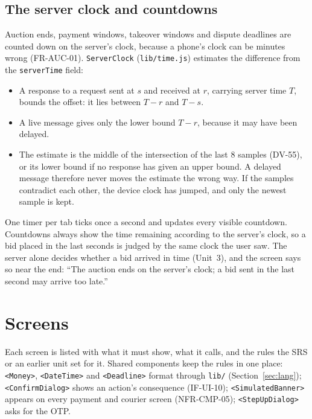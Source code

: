 \documentclass[11pt,a4paper]{article}
\begin{document}
\subsection{The server clock and countdowns}
\label{sec:clock}
Auction ends, payment windows, takeover windows and dispute deadlines are counted down on the server's clock, because a phone's clock can be minutes wrong (FR-AUC-01). \texttt{ServerClock} (\texttt{lib/time.js}) estimates the difference from the \texttt{serverTime} field:
\begin{itemize}[nosep]
  \item A response to a request sent at $s$ and received at $r$, carrying server time $T$, bounds the offset: it lies between $T - r$ and $T - s$.
  \item A live message gives only the lower bound $T - r$, because it may have been delayed.
  \item The estimate is the middle of the intersection of the last 8 samples (DV-55), or its lower bound if no response has given an upper bound. A delayed message therefore never moves the estimate the wrong way. If the samples contradict each other, the device clock has jumped, and only the newest sample is kept.
\end{itemize}
One timer per tab ticks once a second and updates every visible countdown. Countdowns always show the time remaining according to the server's clock, so a bid placed in the last seconds is judged by the same clock the user saw. The server alone decides whether a bid arrived in time (Unit~3), and the screen says so near the end: ``The auction ends on the server's clock; a bid sent in the last second may arrive too late.''
\section{Screens}
\label{sec:screens}
Each screen is listed with what it must show, what it calls, and the rules the SRS or an earlier unit set for it. Shared components keep the rules in one place: \texttt{<Money>}, \texttt{<DateTime>} and \texttt{<Deadline>} format through \texttt{lib/} (Section~\ref{sec:lang}); \texttt{<ConfirmDialog>} shows an action's consequence (IF-UI-10); \texttt{<SimulatedBanner>} appears on every payment and courier screen (NFR-CMP-05); \texttt{<StepUpDialog>} asks for the OTP.
\end{document}
